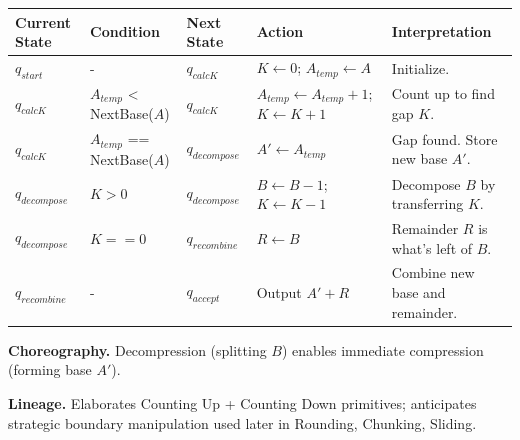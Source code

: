\documentclass[12pt]{book}
\begin{document}
\begin{longtable}[]{@{}
  >{\raggedright\arraybackslash}p{}
  >{\raggedright\arraybackslash}p{}
  >{\raggedright\arraybackslash}p{}
  >{\raggedright\arraybackslash}p{}
  >{\raggedright\arraybackslash}p{}@{}}
\toprule\noalign{}
\begin{minipage}[b]{\linewidth}\raggedright
Current State
\end{minipage} & \begin{minipage}[b]{\linewidth}\raggedright
Condition
\end{minipage} & \begin{minipage}[b]{\linewidth}\raggedright
Next State
\end{minipage} & \begin{minipage}[b]{\linewidth}\raggedright
Action
\end{minipage} & \begin{minipage}[b]{\linewidth}\raggedright
Interpretation
\end{minipage} \\
\midrule\noalign{}
\endhead
\bottomrule\noalign{}
\endlastfoot
\(q_{start}\) & - & \(q_{calcK}\) & \(K \leftarrow 0\);
\(A_{temp} \leftarrow A\) & Initialize. \\
\(q_{calcK}\) & \(A_{temp}\) \textless{} NextBase(\(A\)) & \(q_{calcK}\)
& \(A_{temp} \leftarrow A_{temp} + 1\); \(K \leftarrow K + 1\) & Count
up to find gap \(K\). \\
\(q_{calcK}\) & \(A_{temp}\) == NextBase(\(A\)) & \(q_{decompose}\) &
\(A' \leftarrow A_{temp}\) & Gap found. Store new base \(A'\). \\
\(q_{decompose}\) & \(K > 0\) & \(q_{decompose}\) &
\(B \leftarrow B - 1\); \(K \leftarrow K - 1\) & Decompose \(B\) by
transferring \(K\). \\
\(q_{decompose}\) & \(K == 0\) & \(q_{recombine}\) & \(R \leftarrow B\)
& Remainder \(R\) is what's left of \(B\). \\
\(q_{recombine}\) & - & \(q_{accept}\) & Output \(A' + R\) & Combine new
base and remainder. \\
\end{longtable}

\textbf{Choreography.} Decompression (splitting \(B\)) enables immediate
compression (forming base \(A'\)).

\textbf{Lineage.} Elaborates Counting Up + Counting Down primitives;
anticipates strategic boundary manipulation used later in Rounding,
Chunking, Sliding.
\end{document}
